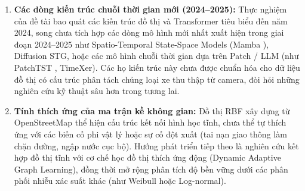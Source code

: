 \begin{enumerate}
    \item \textbf{Các dòng kiến trúc chuỗi thời gian mới (2024--2025):} Thực nghiệm của đề tài bao quát các kiến trúc đồ thị và Transformer tiêu biểu đến năm 2024, song chưa tích hợp các dòng mô hình mới nhất xuất hiện trong giai đoạn 2024--2025 như Spatio-Temporal State-Space Models (Mamba \cite{mamba}), Diffusion STG, hoặc các mô hình chuỗi thời gian dựa trên Patch / LLM (như PatchTST \cite{patchtst}, TimeXer). Các họ kiến trúc này chưa được chuẩn hóa cho dữ liệu đồ thị có cấu trúc phân tách chủng loại xe thu thập từ camera, đòi hỏi những nghiên cứu kỹ thuật sâu hơn trong tương lai.
    \item \textbf{Tính thích ứng của ma trận kề không gian:} Đồ thị RBF xây dựng từ OpenStreetMap thể hiện cấu trúc kết nối hình học tĩnh, chưa thể tự thích ứng với các biến cố phi vật lý hoặc sự cố đột xuất (tai nạn giao thông làm chặn đường, ngập nước cục bộ). Hướng phát triển tiếp theo là nghiên cứu kết hợp đồ thị tĩnh với cơ chế học đồ thị thích ứng động (Dynamic Adaptive Graph Learning), đồng thời mở rộng phân tích độ bền vững dưới các phân phối nhiễu xác suất khác (như Weibull hoặc Log-normal).
\end{enumerate}
